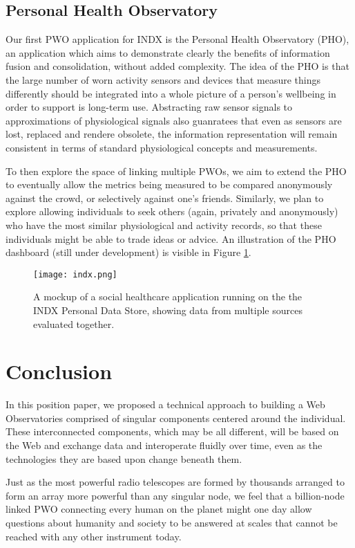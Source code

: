 \documentclass{acm_proc_article-sp}
\begin{document}
\subsection{Personal Health Observatory}

Our first PWO application for INDX is the Personal Health Observatory (PHO), an application which aims to demonstrate clearly the benefits of information fusion and consolidation, without added complexity.  The idea of the PHO is that the large number of worn activity sensors and devices that measure things differently should be integrated into a whole picture of a person's wellbeing in order to support is long-term use.  Abstracting raw sensor signals to approximations of physiological signals also guanratees that even as sensors are lost, replaced and rendere obsolete, the information representation will remain consistent in terms of standard physiological concepts and measurements.

To then explore the space of linking multiple PWOs, we aim to extend the PHO to eventually allow the metrics being measured to be compared anonymously against the crowd, or selectively against one's friends.  Similarly, we plan to explore allowing individuals to seek others (again, privately and anonymously) who have the most similar physiological and activity records, so that these individuals might be able to trade ideas or advice.  An illustration of the PHO dashboard (still under development) is visible in Figure \ref{fig:pho}.

\begin{figure}
\centering
\texttt{[image: indx.png]}
\caption{A mockup of a social healthcare application running on the the INDX Personal Data Store, showing data from multiple sources evaluated together.}\label{fig:pho}
\end{figure}

\section{Conclusion}

In this position paper, we proposed a technical approach to building a Web Observatories comprised of singular components centered around the individual.  These interconnected components, which may be all different, will be based on the Web and exchange data and interoperate fluidly over time, even as the technologies they are based upon change beneath them.  

Just as the most powerful radio telescopes are formed by thousands arranged to form an array more powerful than any singular node, we feel that a billion-node linked PWO connecting every human on the planet might one day allow questions about humanity and society to be answered at scales that cannot be reached with any other instrument today.




\balancecolumns
\end{document}
